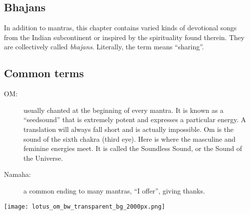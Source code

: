   \subsection*{Bhajans}
  In addition to mantras, this chapter contains varied kinds of devotional songs from the Indian
  subcontinent or inspired by the spirituality found therein. They are collectively called 
  \emph{bhajans}. Literally, the term means ``sharing''.

  \subsection*{Common terms}
  \begin{description}
   \item[OM:] usually chanted at the beginning of every mantra. It is known as a ``seedsound'' that 
     is extremely potent and expresses a particular energy. A translation will always fall short 
     and is actually impossible. Om is the sound of the sixth chakra (third eye). Here is where 
     the masculine and feminine energies meet. It is called the Soundless Sound, or the Sound of 
     the Universe.
   \item[Namaha:] a common ending to many mantras, ``I offer'', giving thanks.
  \end{description}
  \begin{center}%
    \vspace*{\fill}%
    \texttt{[image: lotus\_om\_bw\_transparent\_bg\_2000px.png]}%
    \vspace*{\fill}%
  \end{center}%
